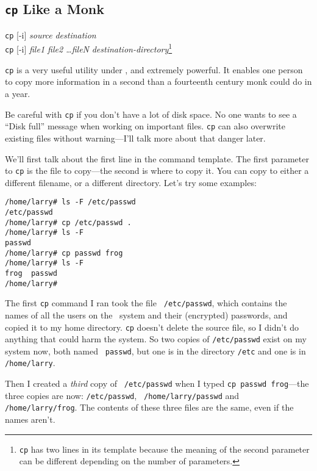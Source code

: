 \subsection{{\tt cp} Like a Monk}

\begin{command}
{\tt cp} [-i] {\sl source} {\sl destination}\\
{\tt cp} [-i] {\sl file1 file2 \ldots fileN} {\sl
  destination-directory}\footnote{{\tt cp} has two lines in its
  template because the meaning of the second parameter can be
  different depending on the number of parameters.}
\end{command}

{\tt cp} is a very useful utility under \unix, and extremely powerful.  It
enables one person to copy more information in a second than a fourteenth
century monk could do in a year.

\cautionpar Be careful with {\tt cp} if you don't have a lot of disk
space.  No one wants to see a ``Disk full'' message when working on
important files. {\tt cp} can also overwrite existing files without
warning---I'll talk more about that danger later.

We'll first talk about the first line in the command template.  The
first parameter to {\tt cp} is the file to copy---the second is where to
copy it.  You can copy to either a different filename, or a different
directory. Let's try some examples:

\begin{screen}\begin{verbatim}
/home/larry# ls -F /etc/passwd
/etc/passwd
/home/larry# cp /etc/passwd .
/home/larry# ls -F
passwd
/home/larry# cp passwd frog
/home/larry# ls -F
frog  passwd
/home/larry#
\end{verbatim}
\end{screen}

The first {\tt cp} command I ran took the file {\tt
  /etc/passwd}, which contains the names of all
the users on the \unix\ system and their (encrypted) passwords, and
copied it to my home directory.  {\tt cp} doesn't delete the source
file, so I didn't do anything that could harm the system.  So two
copies of {\tt /etc/passwd} exist on my system now, both named {\tt
  passwd}, but one is in the directory {\tt /etc} and one is in {\tt
  /home/larry}.

Then I created a {\em third\/} copy of {\tt
  /etc/passwd} when I typed {\tt cp passwd
  frog}---the three copies are now: {\tt /etc/passwd}, {\tt
  /home/larry/passwd} and {\tt /home/larry/frog}. The contents of
these three files are the same, even if the names aren't.

